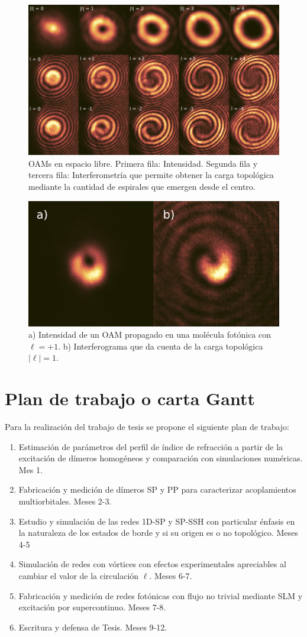 \documentclass{article}
\begin{document}
\begin{figure}[H]
	\centering
	\includegraphics[width=0.8\linewidth]{./media/OAM-free.png}
	\caption{OAMs en espacio libre. Primera fila: Intensidad. Segunda fila y tercera fila: Interferometría que permite obtener la carga topológica mediante la cantidad de espirales que emergen desde el centro.
	\label{fig:OAMfree}}
\end{figure}

\begin{figure}[H]
	\centering
	\includegraphics[width=0.5\linewidth]{./media/vortex2.png}
	\caption{a) Intensidad de un OAM propagado en una molécula fotónica con $\ell = +1$. b) Interferograma que da cuenta de la carga topológica $|\ell| = 1$. \label{fig:vortex}}
\end{figure} 

\section{Plan de trabajo o carta Gantt}

Para la realización del trabajo de tesis se propone el siguiente plan de trabajo:

\begin{enumerate}
	\item Estimación de parámetros del perfil de índice de refracción a partir de la excitación de dímeros homogéneos y comparación con simulaciones numéricas. Mes 1.
	\item Fabricación y medición de dímeros SP y PP para caracterizar acoplamientos multiorbitales. Meses 2-3.
	\item Estudio y simulación de las redes 1D-SP y SP-SSH con particular énfasis en la naturaleza de los estados de borde y si su origen es o no topológico. Meses 4-5
	\item Simulación de redes con vórtices con efectos experimentales apreciables al cambiar el valor de la circulación $\ell$. Meses 6-7.
	\item Fabricación y medición de redes fotónicas con flujo no trivial mediante SLM y excitación por supercontinuo. Meses 7-8.
	\item Escritura y defensa de Tesis. Meses 9-12.
\end{enumerate}


\renewcommand\refname{Referencias}




\end{document}
